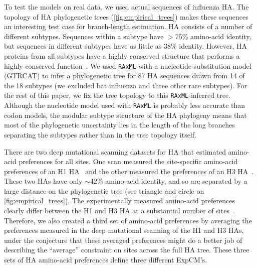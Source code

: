 \documentclass[11pt]{article}
\begin{document}
To test the models on real data, we used actual sequences of influenza HA. 
The topology of HA phylogenetic trees (\ref{fig:empirical_trees}) makes these sequences an interesting test case for branch-length estimation.
HA consists of a number of different subtypes.
Sequences within a subtype have $>75\%$ amino-acid identity, but sequences in different subtypes have as little as 38\% identity.
However, HA proteins from all subtypes have a highly conserved structure that performs a highly conserved function~\citep{ha2002h5,russell2004h1}.
We used \texttt{RAxML}  with a nucleotide substitution model  (GTRCAT) to infer a phylogenetic tree for 87 HA sequences drawn from 14 of the 18 subtypes (we excluded bat influenza and three other rare subtypes).
For the rest of this paper, we fix the tree topology to this \texttt{RAxML}-inferred tree.
Although the nucleotide model used with \texttt{RAxML} is probably less accurate than codon models, the modular subtype structure of the HA phylogeny means that most of the phylogenetic uncertainty lies in the length of the long branches separating the subtypes rather than in the tree topology itself.

There are two deep mutational scanning datasets for HA that estimated amino-acid preferences for all sites.
One scan measured the site-specific amino-acid preferences of an H1 HA~\citep{doud2016accurate} and the other measured the preferences of an H3 HA~\citep{lee2018deep}.
These two HAs have only $\sim$42\% amino-acid identity, and so are separated by a large distance on the phylogenetic tree (see triangle and circle on \ref{fig:empirical_trees}).
The experimentally measured amino-acid preferences clearly differ between the H1 and H3 HA at a substantial number of sites~\citep[][\ref{suppfig:prefs_doud}, 
\ref{suppfig:prefs_lee}]{lee2018deep}.
Therefore, we also created a third set of amino-acid preferences by averaging the preferences measured in the deep mutational scanning of the H1 and H3 HAs, under the conjecture that these averaged preferences might do a better job of describing the ``average'' constraint on sites across the full HA tree.
These three sets of HA amino-acid preferences define three different ExpCM's.
 
\end{document}
